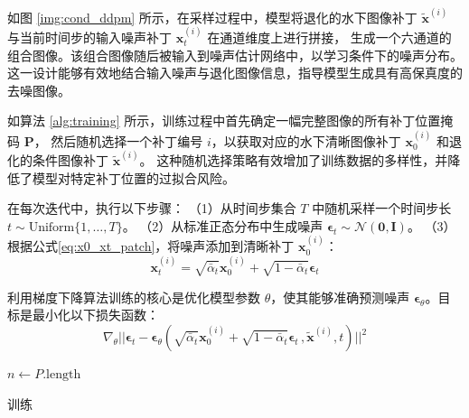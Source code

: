 如图 \ref{img:cond_ddpm} 所示，在采样过程中，模型将退化的水下图像补丁 $\tilde{\mathbf{x}}^{(i)}$ 与当前时间步的输入噪声补丁 $\mathbf{x}^{(i)}_t$ 在通道维度上进行拼接，
生成一个六通道的组合图像。该组合图像随后被输入到噪声估计网络中，以学习条件下的噪声分布。
这一设计能够有效地结合输入噪声与退化图像信息，指导模型生成具有高保真度的去噪图像。

如算法 \ref{alg:training} 所示，训练过程中首先确定一幅完整图像的所有补丁位置掩码 $\bm{P}$，
然后随机选择一个补丁编号 $i$，以获取对应的水下清晰图像补丁 $\mathbf{x}_0^{(i)}$ 和退化的条件图像补丁 $\tilde{\mathbf{x}}^{(i)}$。
这种随机选择策略有效增加了训练数据的多样性，并降低了模型对特定补丁位置的过拟合风险。

在每次迭代中，执行以下步骤：
（1）从时间步集合 $T$ 中随机采样一个时间步长$t \sim \text{Uniform}\{1,\ldots,T\}$。
（2）从标准正态分布中生成噪声 $\bm{\epsilon}_t \sim \mathcal{N}(\mathbf{0}, \mathbf{I})$。
（3）根据公式\eqref{eq:x0_xt_patch}，将噪声添加到清晰补丁 $\mathbf{x}_0^{(i)}$：
\begin{equation}
\label{eq:x0_xt_patch}
    \mathbf{x}_t^{(i)} = \sqrt{\bar{\alpha}_t} \mathbf{x}_0^{(i)} + \sqrt{1 - \bar{\alpha}_t} \bm{\epsilon}_t
\end{equation}

利用梯度下降算法训练的核心是优化模型参数 $\theta$，使其能够准确预测噪声 $\bm{\epsilon}_\theta$。目标是最小化以下损失函数：
\begin{equation}
    \nabla_{\theta}\vert\vert\bm{\epsilon}_t -  \bm{\epsilon}_{\theta}(\sqrt{\bar{\alpha}_t}\mathbf{x}_0^{(i)}+\sqrt{1-\bar{\alpha}_t}\bm{\epsilon}_t\,,\tilde{\mathbf{x}}^{(i)},t)\vert\vert^2
\end{equation}

\begin{algorithm}[ht]
    \SetAlgoLined
  
    $n \leftarrow P.\text{length}$\;
    \caption{训练}
    \label{alg:training}
  \end{algorithm}

